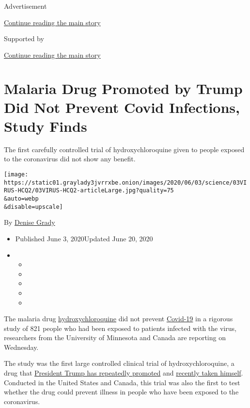 Advertisement

\protect\hyperlink{after-top}{Continue reading the main story}

Supported by

\protect\hyperlink{after-sponsor}{Continue reading the main story}

\hypertarget{malaria-drug-promoted-by-trump-did-not-prevent-covid-infections-study-finds}{%
\section{Malaria Drug Promoted by Trump Did Not Prevent Covid
Infections, Study
Finds}\label{malaria-drug-promoted-by-trump-did-not-prevent-covid-infections-study-finds}}

The first carefully controlled trial of hydroxychloroquine given to
people exposed to the coronavirus did not show any benefit.

\texttt{[image: https://static01.graylady3jvrrxbe.onion/images/2020/06/03/science/03VIRUS-HCQ2/03VIRUS-HCQ2-articleLarge.jpg?quality=75\\\&auto=webp\\\&disable=upscale]}

By \href{https://www.nytimes3xbfgragh.onion/by/denise-grady}{Denise
Grady}

\begin{itemize}
\item
  Published June 3, 2020Updated June 20, 2020
\item
  \begin{itemize}
  \item
  \item
  \item
  \item
  \item
  \end{itemize}
\end{itemize}

The malaria drug
\href{https://www.nytimes3xbfgragh.onion/2020/06/20/health/hydroxychloroquine-coronavirus-trial.html}{hydroxychloroquine}
did not prevent
\href{https://www.nytimes3xbfgragh.onion/2020/06/15/health/fda-hydroxychloroquine-malaria.html}{Covid-19}
in a rigorous study of 821 people who had been exposed to patients
infected with the virus, researchers from the University of Minnesota
and Canada are reporting on Wednesday.

The study was the first large controlled clinical trial of
hydroxychloroquine, a drug that
\href{https://www.nytimes3xbfgragh.onion/2020/05/21/us/politics/trump-fact-check-hydroxychloroquine-coronavirus-.html}{President
Trump has repeatedly promoted} and
\href{https://www.nytimes3xbfgragh.onion/2020/05/18/us/politics/trump-hydroxychloroquine-covid-coronavirus.html}{recently
taken himself}. Conducted in the United States and Canada, this trial
was also the first to test whether the drug could prevent illness in
people who have been exposed to the coronavirus.

